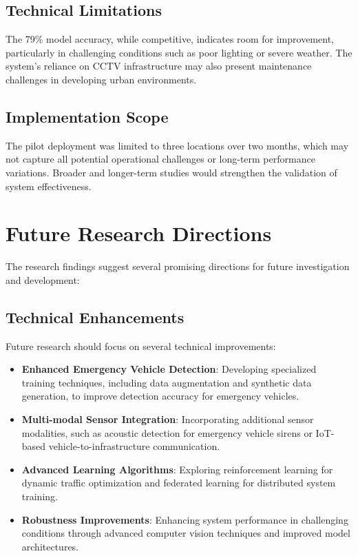 \subsection{Technical Limitations}
The 79\% model accuracy, while competitive, indicates room for improvement, particularly in challenging conditions such as poor lighting or severe weather. The system's reliance on CCTV infrastructure may also present maintenance challenges in developing urban environments.

\subsection{Implementation Scope}
The pilot deployment was limited to three locations over two months, which may not capture all potential operational challenges or long-term performance variations. Broader and longer-term studies would strengthen the validation of system effectiveness.

\section{Future Research Directions}
\label{sec:future_work}

The research findings suggest several promising directions for future investigation and development:

\subsection{Technical Enhancements}
Future research should focus on several technical improvements:

\begin{itemize}
    \item \textbf{Enhanced Emergency Vehicle Detection}: Developing specialized training techniques, including data augmentation and synthetic data generation, to improve detection accuracy for emergency vehicles.
    
    \item \textbf{Multi-modal Sensor Integration}: Incorporating additional sensor modalities, such as acoustic detection for emergency vehicle sirens or IoT-based vehicle-to-infrastructure communication.
    
    \item \textbf{Advanced Learning Algorithms}: Exploring reinforcement learning for dynamic traffic optimization and federated learning for distributed system training.
    
    \item \textbf{Robustness Improvements}: Enhancing system performance in challenging conditions through advanced computer vision techniques and improved model architectures.
\end{itemize}

